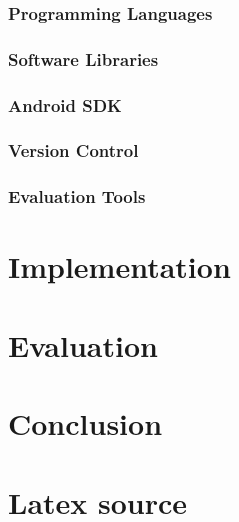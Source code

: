\documentclass[12pt,twoside,notitlepage]{report}
\begin{document}
\subsection{Programming Languages}

\subsection{Software Libraries}

\subsection{Android SDK}

\subsection{Version Control}

\subsection{Evaluation Tools}

\cleardoublepage
\chapter{Implementation}

\label{section:Code_Pseudoinstructions}


\cleardoublepage
\chapter{Evaluation}


\cleardoublepage
\chapter{Conclusion}



\cleardoublepage



\cleardoublepage

\appendix

\chapter{Latex source}
\end{document}
